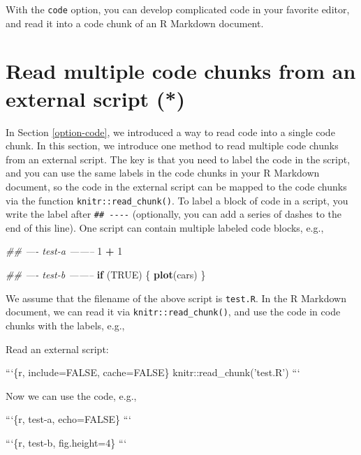 \documentclass[
  11pt,
]{krantz}
\newenvironment{Shaded}{\begin{snugshade}}{\end{snugshade}}
\newcommand{\BaseNTok}[1]{\textcolor[rgb]{0.06,0.06,0.06}{#1}}
\newcommand{\CommentTok}[1]{\textcolor[rgb]{0.37,0.37,0.37}{\textit{#1}}}
\newcommand{\ControlFlowTok}[1]{\textcolor[rgb]{0.27,0.27,0.27}{\textbf{#1}}}
\newcommand{\DecValTok}[1]{\textcolor[rgb]{0.06,0.06,0.06}{#1}}
\newcommand{\KeywordTok}[1]{\textcolor[rgb]{0.27,0.27,0.27}{\textbf{#1}}}
\newcommand{\NormalTok}[1]{#1}
\newcommand{\OperatorTok}[1]{\textcolor[rgb]{0.43,0.43,0.43}{\textbf{#1}}}
\newcommand{\OtherTok}[1]{\textcolor[rgb]{0.37,0.37,0.37}{#1}}
\newcommand{\StringTok}[1]{\textcolor[rgb]{0.5,0.5,0.5}{#1}}
\begin{document}
With the \texttt{code} option, you can develop complicated code in your favorite editor, and read it into a code chunk of an R Markdown document.

\hypertarget{read-chunk}{%
\section{Read multiple code chunks from an external script (*)}\label{read-chunk}}

In Section \ref{option-code}, we introduced a way to read code into a single code chunk. In this section, we introduce one method to read multiple code chunks from an external script. The key is that you need to label the code in the script, and you can use the same labels in the code chunks in your R Markdown document, so the code in the external script can be mapped to the code chunks via the function \texttt{knitr::read\_chunk()}. To label a block of code in a script, you write the label after \texttt{\#\#\ -\/-\/-\/-} (optionally, you can add a series of dashes to the end of this line). One script can contain multiple labeled code blocks, e.g.,

\begin{Shaded}
\begin{Highlighting}[]
\CommentTok{## ---- test-a --------}
\DecValTok{1} \OperatorTok{+}\StringTok{ }\DecValTok{1}

\CommentTok{## ---- test-b --------}
\ControlFlowTok{if}\NormalTok{ (}\OtherTok{TRUE}\NormalTok{) \{}
  \KeywordTok{plot}\NormalTok{(cars)}
\NormalTok{\}}
\end{Highlighting}
\end{Shaded}

We assume that the filename of the above script is \texttt{test.R}. In the R Markdown document, we can read it via \texttt{knitr::read\_chunk()}, and use the code in code chunks with the labels, e.g.,

\begin{Shaded}
\begin{Highlighting}[]
\NormalTok{Read an external script:}

\BaseNTok{```\{r, include=FALSE, cache=FALSE\}}
\BaseNTok{knitr::read_chunk('test.R')}
\BaseNTok{```}

\NormalTok{Now we can use the code, e.g.,}

\BaseNTok{```\{r, test-a, echo=FALSE\}}
\BaseNTok{```}

\BaseNTok{```\{r, test-b, fig.height=4\}}
\BaseNTok{```}
\end{Highlighting}
\end{Shaded}
\end{document}
